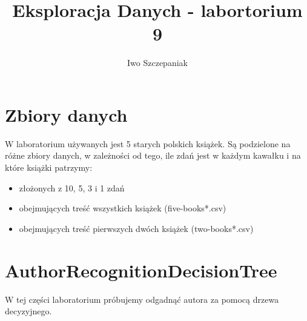 \documentclass{article}
\title{Eksploracja Danych - labortorium 9}
\author{Iwo Szczepaniak}
\begin{document}
\maketitle

\section{Zbiory danych}
W laboratorium używanych jest 5 starych polskich książek. Są podzielone na różne zbiory danych, w zależności od tego, ile zdań jest w każdym kawałku i na które książki patrzymy:

\begin{itemize}
    \item złożonych z 10, 5, 3 i 1 zdań
    \item obejmujących treść wszystkich książek (five-books*.csv)
    \item obejmujących treść pierwszych dwóch książek (two-books*.csv)
\end{itemize}



\section{AuthorRecognitionDecisionTree}
W tej części laboratorium próbujemy odgadnąć autora za pomocą drzewa decyzyjnego.
\end{document}
